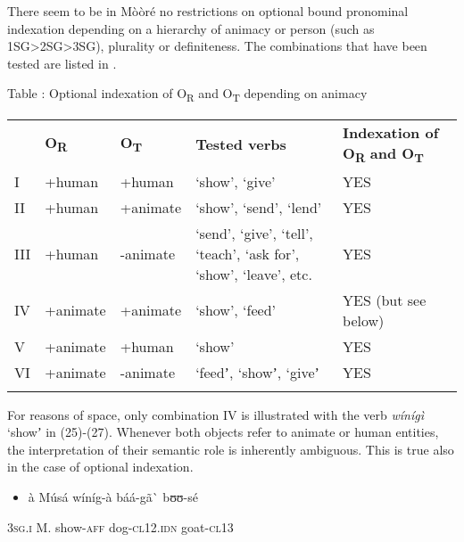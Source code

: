 \documentclass[output=paper]{langsci/langscibook}
\begin{document}
{{There seem to be in M\`{o}\`{o}r\'{e} no restrictions on optional bound pronominal indexation depending on a hierarchy of animacy or person (such as 1SG{\textgreater}2SG{\textgreater}3SG), plurality or definiteness. The combinations that have been tested are listed in .

\begin{styleTabellenberschrift}
\label{bkm:Ref444780805}Table : Optional indexation of O\textsubscript{R} and O\textsubscript{T} depending on animacy
\end{styleTabellenberschrift}

\begin{tabular}{lllll} & \textbf{O}\textbf{\textsubscript{R}} & \textbf{O}\textbf{\textsubscript{T}} & \textbf{Tested verbs} & \textbf{Indexation of O}\textbf{\textsubscript{R}}\textbf{ and O}\textbf{\textsubscript{T}}\textbf{ }\\
\lsptoprule
I & +human & +human & ‘show’, ‘give’ & YES\\
II & +human & +animate & ‘show’, ‘send’, ‘lend’ & YES\\
III & +human & {}-animate & ‘send’, ‘give’, ‘tell’, ‘teach’, ‘ask for’, ‘show’, ‘leave’, etc. & YES\\
IV & +animate & +animate & ‘show’, ‘feed’ & YES (but see below)\\
V & +animate & +human & ‘show’ & YES\\
VI & +animate & {}-animate & ‘feedʼ, ‘showʼ, ‘giveʼ & YES\\
\lspbottomrule
\end{tabular}
For reasons of space, only combination IV is illustrated with the verb \textit{w\'{i}n\'{i}g\`{i}} ‘showʼ in (25){}-(27). Whenever both objects refer to animate or human entities, the interpretation of their semantic role is inherently ambiguous. This is true also in the case of optional indexation.

\begin{itemize}
\item \begin{styleNumberedEX}
\label{bkm:Ref424217838}\`{a}    M\'{u}s\'{a}  w\'{i}n\'{i}g-\`{a}  b\'{a}\'{a}-g\~{a}\`{ }    bʊʊ-s\'{e}
\end{styleNumberedEX}\end{itemize}
\begin{styleGloss}
\textsc{3sg.i  }  M.  show-\textsc{aff}  dog-\textsc{cl12.idn}  goat-\textsc{cl13}
\end{styleGloss}

}}
\end{document}

